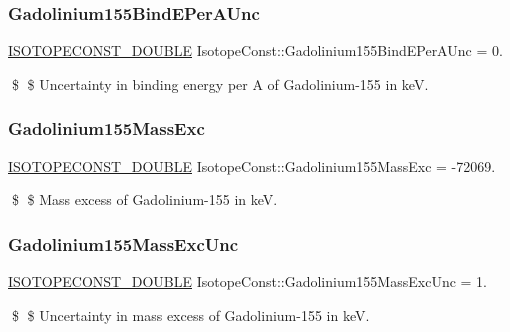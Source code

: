 \subsubsection{\texorpdfstring{Gadolinium155\+Bind\+E\+Per\+A\+Unc}{Gadolinium155BindEPerAUnc}}
{\footnotesize\ttfamily \mbox{\hyperlink{group___isotope_const-_macros_ga8f45a7272ce02c0b4c65c44636ed719a}{I\+S\+O\+T\+O\+P\+E\+C\+O\+N\+S\+T\+\_\+\+D\+O\+U\+B\+LE}} Isotope\+Const\+::\+Gadolinium155\+Bind\+E\+Per\+A\+Unc = 0.}

\$ \$ Uncertainty in binding energy per A of Gadolinium-\/155 in keV. \mbox{\label{group___isotope_const-_gadolinium-_gd155_ga5e42e3048c1b73d450f3f15ba0f6b92a}} 
\subsubsection{\texorpdfstring{Gadolinium155\+Mass\+Exc}{Gadolinium155MassExc}}
{\footnotesize\ttfamily \mbox{\hyperlink{group___isotope_const-_macros_ga8f45a7272ce02c0b4c65c44636ed719a}{I\+S\+O\+T\+O\+P\+E\+C\+O\+N\+S\+T\+\_\+\+D\+O\+U\+B\+LE}} Isotope\+Const\+::\+Gadolinium155\+Mass\+Exc = -\/72069.}

\$ \$ Mass excess of Gadolinium-\/155 in keV. \mbox{\label{group___isotope_const-_gadolinium-_gd155_ga0d9f9fdb741ce4aa59e7b5ef5f8e1f02}} 
\subsubsection{\texorpdfstring{Gadolinium155\+Mass\+Exc\+Unc}{Gadolinium155MassExcUnc}}
{\footnotesize\ttfamily \mbox{\hyperlink{group___isotope_const-_macros_ga8f45a7272ce02c0b4c65c44636ed719a}{I\+S\+O\+T\+O\+P\+E\+C\+O\+N\+S\+T\+\_\+\+D\+O\+U\+B\+LE}} Isotope\+Const\+::\+Gadolinium155\+Mass\+Exc\+Unc = 1.}

\$ \$ Uncertainty in mass excess of Gadolinium-\/155 in keV. \mbox{\label{group___isotope_const-_gadolinium-_gd155_gad67092a5351c5b96ef4df9ffa0775f64}} 

